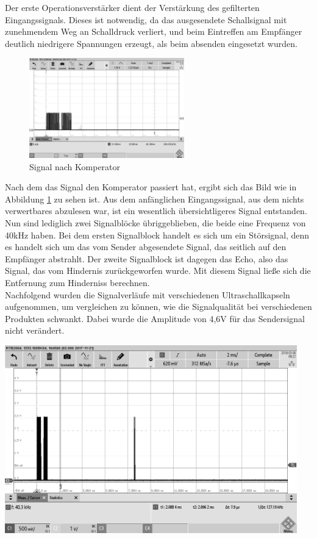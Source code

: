 Der erste Operationsverstärker dient der Verstärkung des gefilterten Eingangssignals. Dieses ist notwendig, da das ausgesendete Schallsignal mit zunehmendem Weg an Schalldruck verliert, und beim Eintreffen am Empfänger deutlich niedrigere Spannungen erzeugt, als beim absenden eingesetzt wurden. 
\begin{figure}[H]
\includegraphics[width=0.6\textwidth, draft]{Abbildungen/Signal-nach-Komperator.png}\caption{Signal nach Komperator}\label{fig:Komperator}
\end{figure}
Nach dem das Signal den Komperator passiert hat, ergibt sich das Bild wie in Abbildung \ref{fig:Komperator} zu sehen ist. Aus dem anfänglichen Eingangssignal, aus dem nichts verwertbares abzulesen war, ist ein wesentlich übersichtligeres Signal entstanden. Nun sind lediglich zwei Signalblöcke übriggeblieben, die beide eine Frequenz von 40kHz haben. Bei dem ersten Signalblock handelt es sich um ein Störsignal, denn es handelt sich um das vom Sender abgesendete Signal, das seitlich auf den Empfänger abstrahlt. Der zweite Signalblock ist dagegen das Echo, also das Signal, das vom Hindernis zurückgeworfen wurde. Mit diesem Signal ließe sich die Entfernung zum Hinderniss berechnen.\\
Nachfolgend wurden die Signalverläufe mit verschiedenen Ultraschallkapseln aufgenommen, um vergleichen zu können, wie die Signalqualität bei verschiedenen Produkten schwankt. Dabei wurde die Amplitude von 4,6V für das Sendersignal nicht verändert.\\
\begin{minipage}{0.5\textwidth}
\includegraphics[width=0.95\textwidth, draft]{Abbildungen/Messungen4,6V/EKULIT1,5m.png}
\label{fig:EKULIT1,5m}
\end{minipage}
